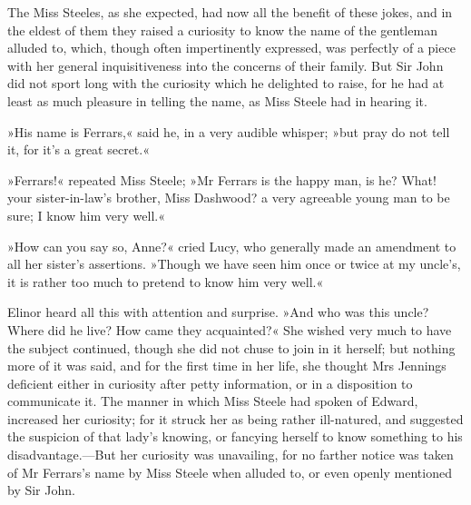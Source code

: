 The Miss Steeles, as she expected, had now all the benefit of these jokes, and in the eldest of them they raised a curiosity to know the name of the gentleman alluded to, which, though often impertinently expressed, was perfectly of a piece with her general inquisitiveness into the concerns of their family. But Sir John did not sport long with the curiosity which he delighted to raise, for he had at least as much pleasure in telling the name, as Miss Steele had in hearing it.

»His name is Ferrars,« said he, in a very audible whisper; »but pray do not tell it, for it’s a great secret.«

»Ferrars!« repeated Miss Steele; »Mr Ferrars is the happy man, is he? What! your sister-in-law’s brother, Miss Dashwood? a very agreeable young man to be sure; I know him very well.«

»How can you say so, Anne?« cried Lucy, who generally made an amendment to all her sister’s assertions. »Though we have seen him once or twice at my uncle’s, it is rather too much to pretend to know him very well.«

Elinor heard all this with attention and surprise. »And who was this uncle? Where did he live? How came they acquainted?« She wished very much to have the subject continued, though she did not chuse to join in it herself; but nothing more of it was said, and for the first time in her life, she thought Mrs Jennings deficient either in curiosity after petty information, or in a disposition to communicate it. The manner in which Miss Steele had spoken of Edward, increased her curiosity; for it struck her as being rather ill-natured, and suggested the suspicion of that lady’s knowing, or fancying herself to know something to his disadvantage.—But her curiosity was unavailing, for no farther notice was taken of Mr Ferrars’s name by Miss Steele when alluded to, or even openly mentioned by Sir John.